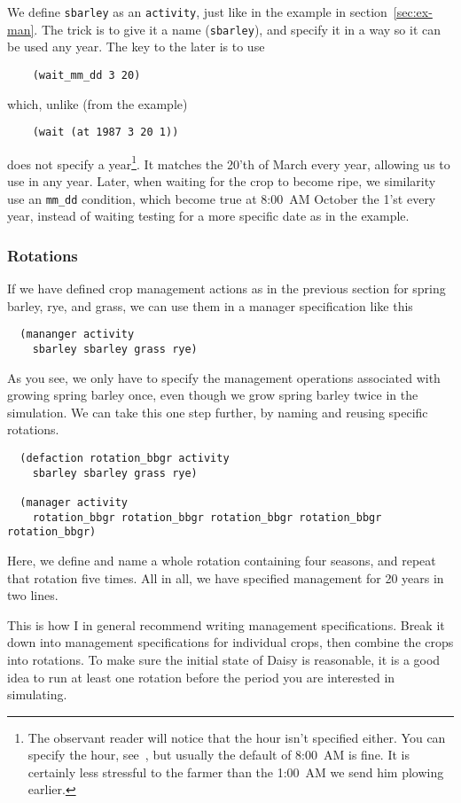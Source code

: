 \documentclass[a4paper]{article}
\begin{document}
We define \texttt{sbarley} as an \texttt{activity}, just like in the
example in section~\ref{sec:ex-man}.  The trick is to give it a name
(\texttt{sbarley}), and specify it in a way so it can be used any
year.  The key to the later is to use
\begin{verbatim}
    (wait_mm_dd 3 20)
\end{verbatim}
which, unlike (from the example)
\begin{verbatim}
    (wait (at 1987 3 20 1))
\end{verbatim}
does not specify a year\footnote{The observant reader will notice that
  the hour isn't specified either.  You can specify the hour,
  see~\cite{dina81}, but usually the default of 8:00~AM is fine.  It
  is certainly less stressful to the farmer than the 1:00~AM we send
  him plowing earlier.}.  It matches the 20'th of March every year,
allowing us to use in any year.  Later, when waiting for the crop to
become ripe, we similarity use an \texttt{mm\_dd} condition, which
become true at 8:00~AM October the 1'st every year, instead of waiting
testing for a more specific date as in the example.

\subsubsection{Rotations}
\label{sec:rotations}

If we have defined crop management actions as in the previous section
for spring barley, rye, and grass, we can use them in a
manager specification like this
\begin{verbatim}
  (mananger activity
    sbarley sbarley grass rye)
\end{verbatim}

As you see, we only have to specify the management operations
associated with growing spring barley once, even though we grow spring
barley twice in the simulation.  We can take this one step further, by
naming and reusing specific rotations.
\begin{verbatim}
  (defaction rotation_bbgr activity
    sbarley sbarley grass rye)

  (manager activity
    rotation_bbgr rotation_bbgr rotation_bbgr rotation_bbgr rotation_bbgr)
\end{verbatim}
Here, we define and name a whole rotation containing four seasons, and
repeat that rotation five times.  All in all, we have specified
management for 20 years in two lines.

This is how I in general recommend writing management specifications.
Break it down into management specifications for individual crops,
then combine the crops into rotations.  To make sure the initial state
of Daisy is reasonable, it is a good idea to run at least one
rotation before the period you are interested in simulating.  
\end{document}
